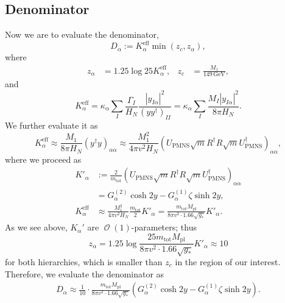 \documentclass[a4paper,11pt]{scrartcl}
\numberwithin{equation}{section}
\newcommand\w[1]{_{\mathrm{#1}}}
\DeclareMathOperator{\Order}{\mathcal{O}}
\newcommand\unit[1]{\,\mathrm{#1}\xspace}
\newcommand\GeV{\unit{GeV}}
\newcommand\mtot{m_{\mathrm{tot}}}
\begin{document}
\subsection{Denominator}
Now we are to evaluate the denominator,
\begin{equation}
 D_\alpha := K_\alpha^{\text{eff}}\min(z_c, z_\alpha),
\end{equation}
where
\begin{align}
 z_\alpha &= 1.25\log25 K_\alpha^{\mathrm{eff}},&
 z_c &= \frac{M_1}{149\GeV},
\end{align}
and
\begin{equation}
 K_\alpha^{\mathrm{eff}}
= \kappa_\alpha \sum_I \frac{\Gamma_I}{H_N}\frac{|y_{I\alpha}|^2}{(yy^\dagger)_{II}}
= \kappa_\alpha \sum_I \frac{M_I|y_{I\alpha}|^2}{8\pi H_N}.
\end{equation}
We further evaluate it as
\begin{equation}
 K_\alpha^{\mathrm{eff}}
\approx\frac{M_1}{8\pi H_N} (y^\dagger y)_{\alpha\alpha}
\approx\frac{M_1^2}{4\pi v^2 H_N} 
\left(
U\w{PMNS}\sqrt{m}R^\dagger R\sqrt{m}U^\dagger\w{PMNS}
\right)_{\alpha\alpha},
\end{equation}
where we proceed as
\begin{align}
 K'_\alpha
&:=
\frac{2}{\mtot}\left(
U\w{PMNS}\sqrt{m}R^\dagger R\sqrt{m}U^\dagger\w{PMNS}
\right)_{\alpha\alpha}\\
&= G_\alpha^{(2)} \cosh2y -G_\alpha^{(1)}\zeta\sinh2y,\\
 K_\alpha^{\mathrm{eff}}
&\approx\frac{M_1^2}{4\pi v^2 H_N} \frac{\mtot}{2}K'_\alpha
=
\frac{m\w{tot}M\w{pl}}{8\pi v^2 \cdot 1.66\sqrt{g_*}}K'_\alpha.
\end{align}
As we see above, $K_\alpha'$ are $\Order(1)$-parameters; thus
\begin{equation}
 z_\alpha=1.25\log\frac{25m\w{tot}M\w{pl}}{8\pi v^2 \cdot 1.66\sqrt{g_*}}K'_\alpha\approx 10
\end{equation}
for both hierarchies, which is smaller than $z_c$ in the region of our interest.
Therefore, we evaluate the denominator as
\begin{align}
 D_\alpha\approx
\frac{1}{10}\cdot\frac{m\w{tot}M\w{pl}}{8\pi v^2 \cdot 1.66\sqrt{g_*}}\left(G_\alpha^{(2)} \cosh2y -G_\alpha^{(1)}\zeta\sinh2y\right).
\end{align}
\end{document}
